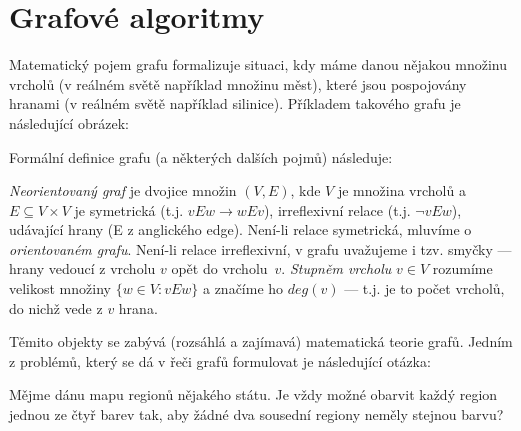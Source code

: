 \ifx\ucebnice\undefined

\setcounter{section}{4}
\fi
\section{Grafové algoritmy}

Matematický pojem grafu formalizuje situaci, kdy máme danou nějakou množinu vrcholů (v reálném světě například množinu měst), které
jsou pospojovány hranami (v reálném světě například silinice). Příkladem takového grafu je následující obrázek:

\begin{center}
\end{center}

Formální definice grafu (a některých dalších pojmů) následuje:

\begin{definition} \emph{Neorientovaný graf} je dvojice množin $(V,E)$, kde $V$ je množina vrcholů a $E\subseteq V\times V$ je symetrická (t.j. $vEw\rightarrow wEv$),
irreflexivní relace (t.j. $\neg vEw$), udávající hrany (E z anglického edge). Není-li relace symetrická, mluvíme o \emph{orientovaném grafu}. Není-li relace
irreflexivní, v grafu uvažujeme i tzv. smyčky --- hrany vedoucí z vrcholu $v$ opět do vrcholu~$v$. \emph{Stupněm vrcholu} $v\in V$ rozumíme velikost množiny
$\{w\in V:vEw\}$ a značíme ho $deg(v)$ --- t.j. je to počet vrcholů, do nichž vede z $v$ hrana.
\end{definition}

Těmito objekty se zabývá (rozsáhlá a zajímavá) matematická teorie grafů. Jedním z problémů, který se dá v řeči grafů formulovat
je následující otázka:

\begin{question}\label{question:barvenimapy} Mějme dánu mapu regionů nějakého státu. Je vždy možné obarvit každý region jednou ze čtyř barev tak, aby žádné dva sousední
regiony neměly stejnou barvu?
\end{question}

